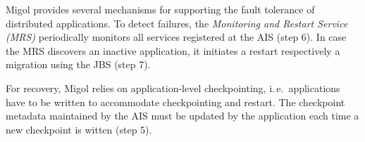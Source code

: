\documentclass[conference,final]{IEEEtran}
\begin{document}
             

Migol provides several mechanisms for supporting the fault tolerance of 
distributed applications.
To detect failures, the \emph{Monitoring and Restart Service (MRS)}
periodically monitors all services registered at the AIS (step 6). 
In case the MRS discovers an inactive application, 
it initiates a restart respectively a migration using the JBS (step 7).

For recovery, Migol relies on application-level checkpointing, i.\,e.\
applications have to be written to accommodate checkpointing and
restart.  The checkpoint metadata maintained by the AIS must be updated by the application
each time a new checkpoint is witten  (step 5).

\end{document}
